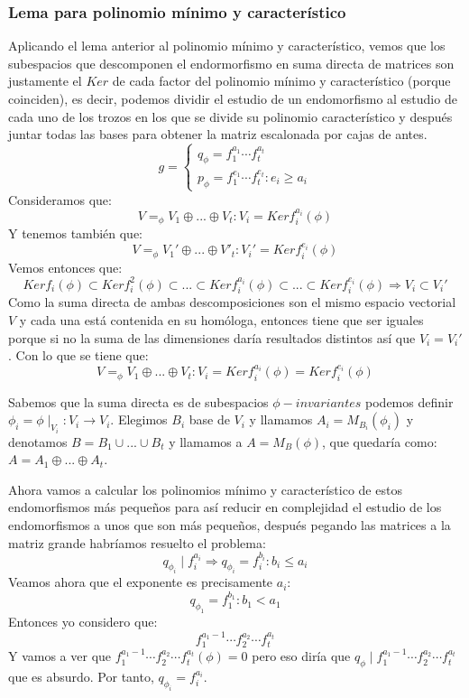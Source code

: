 \documentclass[10pt,a4paper,openright]{book}
\begin{document}
\subsubsection*{Lema para polinomio mínimo y característico}
Aplicando el lema anterior al polinomio mínimo y característico, vemos que los subespacios que descomponen el endormorfismo en suma directa de matrices son justamente el $Ker$ de cada factor del polinomio mínimo y característico (porque coinciden), es decir, podemos dividir el estudio de un endomorfismo al estudio de cada uno de los trozos en los que se divide su polinomio característico y después juntar todas las bases para obtener la matriz escalonada por cajas de antes.
$$g=\begin{cases}q_\phi = f_1^{a_1}\cdots f_t^{a_t}\\ p_\phi = f_1^{e_1}\cdots f_t^{e_t}: e_i\geq a_i\end{cases}$$
Consideramos que:
$$V=_\phi V_1\oplus ... \oplus V_t: V_i=Kerf_i^{a_i}(\phi)$$
Y tenemos también que:
$$V=_\phi V_1'\oplus ... \oplus V'_t: V_i'=Kerf_i^{e_i}(\phi)$$
Vemos entonces que:
$$Kerf_i(\phi)\subset Kerf_i^2(\phi)\subset ... \subset Kerf_i^{a_i}(\phi)\subset ... \subset Kerf_i^{e_i}(\phi)\Rightarrow V_i\subset V_i'$$
Como la suma directa de ambas descomposiciones son el mismo espacio vectorial $V$ y cada una está contenida en su homóloga, entonces tiene que ser iguales porque si no la suma de las dimensiones daría resultados distintos así que $V_i=V_i'$. Con lo que se tiene que:
$$V=_\phi V_1\oplus ... \oplus V_t: V_i=Kerf_i^{a_i}(\phi)=Kerf_i^{e_i}(\phi)$$

Sabemos que la suma directa es de subespacios $\phi-invariantes$ podemos definir $\phi_i=\phi\mid_{V_i}: V_i\rightarrow V_i$. Elegimos $B_i$ base de $V_i$ y llamamos $A_i=M_{B_i}(\phi_i)$ y denotamos $B=B_1\cup ... \cup B_t$ y llamamos a $A=M_B(\phi)$, que quedaría como: $A=A_1\oplus ... \oplus A_t$.

Ahora vamos a calcular los polinomios mínimo y característico de estos endomorfismos más pequeños para así reducir en complejidad el estudio de los endomorfismos a unos que son más pequeños, después pegando las matrices a la matriz grande habríamos resuelto el problema:
$$q_{\phi_i}\mid f_i^{a_i}\Rightarrow q_{\phi_i}=f_{i}^{b_i}: b_i\leq a_i$$
Veamos ahora que el exponente es precisamente $a_i$:
$$q_{\phi_1}=f_1^{b_1}: b_1<a_1$$
Entonces yo considero que:
$$f_1^{a_1-1}\cdots f_2^{a_2} \cdots f_t^{a_t}$$
Y vamos a ver que $f_1^{a_1-1}\cdots f_2^{a_2} \cdots f_t^{a_t}(\phi)=0$ pero eso diría que $q_\phi\mid f_1^{a_1-1}\cdots f_2^{a_2} \cdots f_t^{a_t}$ que es absurdo. Por tanto, $q_{\phi_i}=f_i^{a_i}$.
\end{document}
